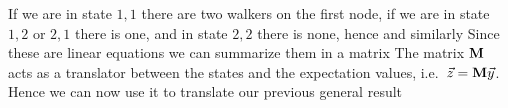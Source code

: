 \solution 
If we are in state $1,1$ there are two walkers on the first node, if we are in state $1,2$ or $2,1$ there is one, and in state $2,2$ there is none, hence 
and similarly 
Since these are linear equations we can summarize them in a matrix
The matrix $\bf M$ acts as a translator between the states and the expectation values, i.e.~$\vec{z}={\bf M}\vec{y}$. 
Hence we can now use it to translate our previous general result 
{\small
{}}
